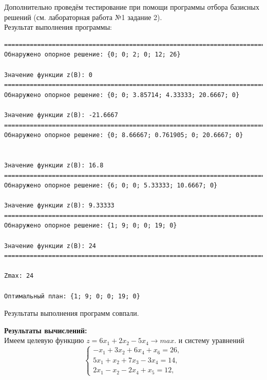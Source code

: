 \documentclass[a4paper,14pt]{extarticle}
\begin{document}
Дополнительно проведём тестирование при помощи программы отбора базисных решений (см. лабораторная работа №1 задание 2).\\
Результат выполнения программы:
\begin{verbatim}
==================================================================================================================
Обнаружено опорное решение: {0; 0; 2; 0; 12; 26}

Значение функции z(B): 0
==================================================================================================================
Обнаружено опорное решение: {0; 0; 3.85714; 4.33333; 20.6667; 0}

Значение функции z(B): -21.6667
==================================================================================================================
Обнаружено опорное решение: {0; 8.66667; 0.761905; 0; 20.6667; 0}


Значение функции z(B): 16.8
==================================================================================================================
Обнаружено опорное решение: {6; 0; 0; 5.33333; 10.6667; 0}

Значение функции z(B): 9.33333
==================================================================================================================
Обнаружено опорное решение: {1; 9; 0; 0; 19; 0}

Значение функции z(B): 24
==================================================================================================================

Zmax: 24

Оптимальный план: {1; 9; 0; 0; 19; 0}
\end{verbatim}

Результаты выполнения программ совпали.\bigbreak

\textbf{Результаты вычислений: }\\
Имеем целевую функцию
$z = 6 x_1 + 2x_2 -5x_4 \rightarrow max$.
и систему уравнений
\begin{equation*}
    \begin{cases}
        -x_1 + 3x_2 + 6x_4 + x_6 = 26, \\
        5x_1 + x_2 + 7x_3 -3x_4 = 14,  \\
        2x_1 - x_2 - 2x_4 + x_5 = 12,
    \end{cases}
\end{equation*}
\end{document}
